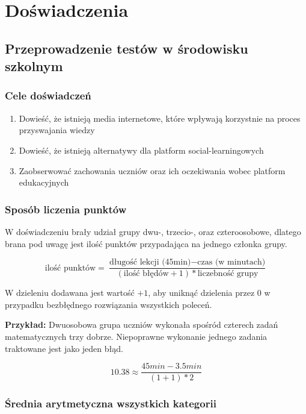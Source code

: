 \documentclass[10pt]{beamer}
\begin{document}
\section{Doświadczenia}
\subsection{Przeprowadzenie testów w środowisku szkolnym}

\begin{frame}
\frametitle{Cele doświadczeń}
\begin{enumerate}
  \item Dowieść, że istnieją media internetowe, które wpływają korzystnie na proces przyswajania wiedzy
  \item Dowieść, że istnieją alternatywy dla platform social-learningowych
  \item Zaobserwować zachowania uczniów oraz ich oczekiwania wobec platform edukacyjnych
\end{enumerate}
\end{frame}

\begin{frame}
\frametitle{Sposób liczenia punktów}
\small
W doświadczeniu brały udział grupy dwu-, trzecio-, oraz czteroosobowe, dlatego brana pod uwagę jest ilość punktów przypadająca na jednego członka grupy.

$$\text{ilość punktów} = \frac{\text{długość lekcji (45min)} - \text{czas (w minutach)}}{ (\text{ilość błędów}+1) * \text{liczebność grupy}}$$

W dzieleniu dodawana jest wartość $+1$, aby uniknąć dzielenia przez $0$ w przypadku bezbłędnego rozwiązania wszystkich poleceń.

\textbf{Przykład:} Dwuosobowa grupa uczniów wykonała spośród czterech zadań matematycznych trzy dobrze. Niepoprawne wykonanie jednego zadania traktowane jest jako jeden błąd.

$$10.38 \approx \frac{45min - 3.5min}{ (1+1) * \text{2}}$$
\end{frame}


\begin{frame}
\frametitle{Średnia arytmetyczna wszystkich kategorii}

\begin{figure}[H]
	

\end{figure}
\end{frame}
\end{document}
